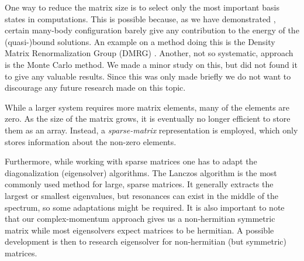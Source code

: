 \documentclass[../main/report.tex]{subfiles}
\begin{document}
One way to reduce the matrix size is to select only the most important basis states in computations.
This is possible because, as we have demonstrated
, certain many-body configuration barely give any contribution to the energy of the (quasi-)bound solutions. 
An example on a method doing this is the Density Matrix Renormalization Group (DMRG) \cite{DMRG}.
Another, not so systematic, approach is the Monte Carlo method.
We made a minor study on this, but did not found it to give any valuable results.
Since this was only made briefly we do not want to discourage any future research made on this topic.

While a larger system requires more matrix elements, many of the elements are zero. 
As the size of the matrix grows, it is eventually no longer efficient to store them as an array. 
Instead, a \emph{sparse-matrix} representation is employed, which only stores information about the non-zero elements. 

Furthermore, while working with sparse matrices one has to adapt the diagonalization (eigensolver) algorithms. 
The Lanczos algorithm is the most commonly used method for large, sparse matrices.
It generally extracts the largest or smallest eigenvalues, but resonances can exist in the middle of the spectrum, so some adaptations might be required.
It is also important to note that our complex-momentum approach gives us a non-hermitian symmetric matrix while most eigensolvers expect matrices to be hermitian. A possible development is then to research eigensolver for non-hermitian (but symmetric) matrices.

\end{document}
